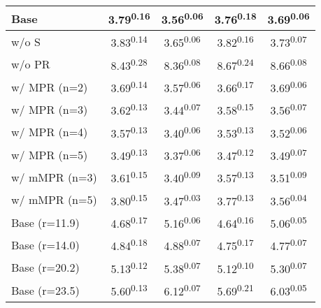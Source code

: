 \begin{table}[]
\begin{tabular}{lcccc}
Base                                    & 3.79\textsuperscript{0.16}          & 3.56\textsuperscript{0.06} & 3.76\textsuperscript{0.18} & 3.69\textsuperscript{0.06}  \\ \midrule
w/o S                                 & 3.83\textsuperscript{0.14}          & 3.65\textsuperscript{0.06} & 3.82\textsuperscript{0.16} & 3.73\textsuperscript{0.07}  \\ 
w/o PR                                  & 8.43\textsuperscript{0.28}          & 8.36\textsuperscript{0.08} & 8.67\textsuperscript{0.24} & 8.66\textsuperscript{0.08}  \\ \midrule
w/ MPR (n=2)                            & 3.69\textsuperscript{0.14}          & 3.57\textsuperscript{0.06} & 3.66\textsuperscript{0.17} & 3.69\textsuperscript{0.06}  \\
w/ MPR (n=3)                            & 3.62\textsuperscript{0.13}          & 3.44\textsuperscript{0.07} & 3.58\textsuperscript{0.15} & 3.56\textsuperscript{0.07}  \\
w/ MPR (n=4)                            & 3.57\textsuperscript{0.13}          & 3.40\textsuperscript{0.06} & 3.53\textsuperscript{0.13} & 3.52\textsuperscript{0.06}  \\
w/ MPR (n=5)                            & 3.49\textsuperscript{0.13}          & 3.37\textsuperscript{0.06} & 3.47\textsuperscript{0.12} & 3.49\textsuperscript{0.07}  \\ \midrule
w/ mMPR (n=3)                           & 3.61\textsuperscript{0.15}          & 3.40\textsuperscript{0.09} & 3.57\textsuperscript{0.13} & 3.51\textsuperscript{0.09}  \\
w/ mMPR (n=5)                           & 3.80\textsuperscript{0.15}          & 3.47\textsuperscript{0.03} & 3.77\textsuperscript{0.13} & 3.56\textsuperscript{0.04}  \\ \midrule
\multicolumn{1}{l}{Base (r=11.9)}    & 4.68\textsuperscript{0.17}          & 5.16\textsuperscript{0.06} & 4.64\textsuperscript{0.16} & 5.06\textsuperscript{0.05}  \\
\multicolumn{1}{l}{Base (r=14.0)}    & 4.84\textsuperscript{0.18}          & 4.88\textsuperscript{0.07} & 4.75\textsuperscript{0.17} & 4.77\textsuperscript{0.07}  \\
\multicolumn{1}{l}{Base (r=20.2)}    & 5.13\textsuperscript{0.12}          & 5.38\textsuperscript{0.07} & 5.12\textsuperscript{0.10} & 5.30\textsuperscript{0.07}  \\ 
\multicolumn{1}{l}{Base (r=23.5)}    & 5.60\textsuperscript{0.13}          & 6.12\textsuperscript{0.07} & 5.69\textsuperscript{0.21} & 6.03\textsuperscript{0.05}  \\ \midrule

\end{tabular}
\end{table}
